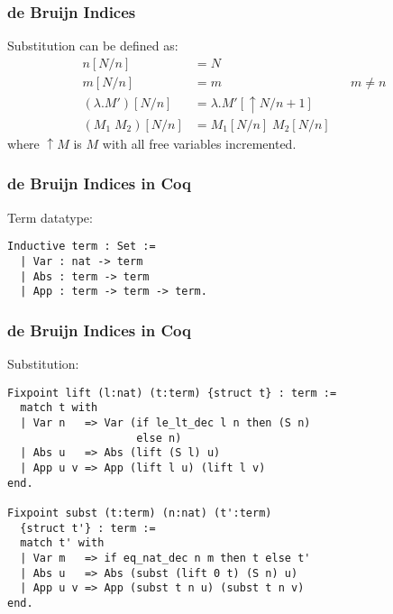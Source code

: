 \documentclass[notheorems]{beamer}
\begin{document}
\begin{frame}

  \frametitle{de Bruijn Indices}

  Substitution can be defined as:
  \begin{align*}
    n[N/n]             &= N\\
    m[N/n]             &= m                    && \text{$m \neq n$} \\
    (\lambda .M')[N/n] &= \lambda .M'[\uparrow \! N / n\!+\!1]\\
    (M_1 \; M_2)[N/n]  &= M_1[N/n] \; M_2[N/n]
  \end{align*}
  where $\uparrow \! M$ is $M$ with all free variables incremented.

\end{frame}


\begin{frame}[fragile]

  \frametitle{de Bruijn Indices in Coq}

  Term datatype:
  \begin{lstlisting}
Inductive term : Set :=
  | Var : nat -> term
  | Abs : term -> term
  | App : term -> term -> term.
  \end{lstlisting}

\end{frame}


\begin{frame}[fragile]

  \frametitle{de Bruijn Indices in Coq}

  Substitution:
  \begin{lstlisting}
Fixpoint lift (l:nat) (t:term) {struct t} : term :=
  match t with
  | Var n   => Var (if le_lt_dec l n then (S n)
                    else n)
  | Abs u   => Abs (lift (S l) u)
  | App u v => App (lift l u) (lift l v)
end.

Fixpoint subst (t:term) (n:nat) (t':term)
  {struct t'} : term :=
  match t' with
  | Var m   => if eq_nat_dec n m then t else t'
  | Abs u   => Abs (subst (lift 0 t) (S n) u)
  | App u v => App (subst t n u) (subst t n v)
end.
  \end{lstlisting}

\end{frame}
\end{document}
